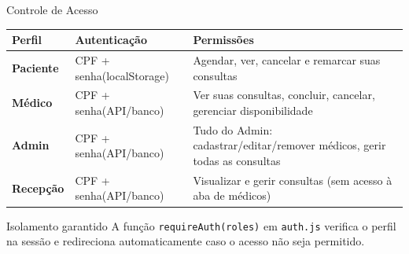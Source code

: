 \documentclass[xcolor={table}]{beamer}
\begin{document}
\begin{frame}{Controle de Acesso}
    \small
    \begin{table}
        \begin{tabular}{>{\bfseries}p{2cm} p{3cm} p{4.5cm}}
            \toprule
            \textbf{Perfil} & \textbf{Autenticação} & \textbf{Permissões} \\
            \midrule
            Paciente   & CPF + senha\newline(localStorage)  & Agendar, ver, cancelar e remarcar suas consultas \\
            Médico     & CPF + senha\newline(API/banco)      & Ver suas consultas, concluir, cancelar, gerenciar disponibilidade \\
            Admin      & CPF + senha\newline(API/banco)      & Tudo do Admin: cadastrar/editar/remover médicos, gerir todas as consultas \\
            Recepção   & CPF + senha\newline(API/banco)      & Visualizar e gerir consultas (sem acesso à aba de médicos) \\
            \bottomrule
        \end{tabular}
    \end{table}
    \vspace{0.2cm}
    \begin{exampleblock}{Isolamento garantido}
        \small
        A função \texttt{requireAuth(roles)} em \texttt{auth.js} verifica o perfil na sessão e redireciona automaticamente caso o acesso não seja permitido.
    \end{exampleblock}
\end{frame}
\end{document}
